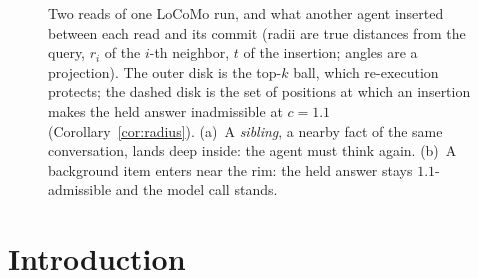 \documentclass[sigconf, nonacm, review]{acmart}
\renewcommand\vldbavailabilityurl{https://github.com/anonymous-ai-researcher/ariadne}
\begin{document}
\maketitle

\let\ariadneurl\url
\def\ariadnetarget{\vldbavailabilityurl}
\renewcommand{\url}[1]{\def\ariadnearg{#1}\ifx\ariadnearg\ariadnetarget\textcolor{blue}{\ariadneurl{#1}}\else\ariadneurl{#1}\fi}
\vldbtopmatter
\let\url\ariadneurl

\begin{figure}[t]
\centering
{}
\caption{Two reads of one LoCoMo run, and
  what another agent inserted between each read and its commit (radii
  are true distances from the query, $r_i$ of the $i$-th neighbor, $t$ of the insertion; angles are a projection). The
  outer disk is the top-$k$ ball, which re-execution protects;
  the dashed disk is the set of positions at which an insertion makes
  the held answer inadmissible at $c=1.1$ (Corollary~\ref{cor:radius}).
  (a)~A \emph{sibling}, a nearby fact of the same conversation, lands
  deep inside: the agent must think again. (b)~A background item enters
  near the rim: the held answer stays $1.1$-admissible and the
  model call stands.}
\label{fig:teaser}
\end{figure}

\section{Introduction}
\label{sec:intro}
\end{document}
